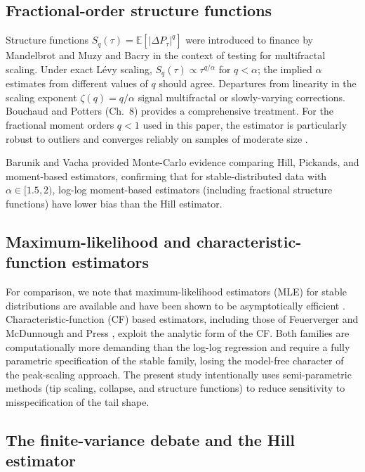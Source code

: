 \documentclass[12pt,a4paper]{article}
\begin{document}
\subsection{Fractional-order structure functions}

Structure functions $S_q(\tau) = \mathbb{E}[|\Delta P_\tau|^q]$ were introduced
to finance by Mandelbrot \cite{Mandelbrot1997} and Muzy and Bacry \cite{MuzyBacry1993} in the
context of testing for multifractal scaling. Under exact Lévy scaling,
$S_q(\tau) \propto \tau^{q/\alpha}$ for $q < \alpha$; the implied $\alpha$
estimates from different values of $q$ should agree. Departures from linearity
in the scaling exponent $\zeta(q) = q/\alpha$ signal multifractal or
slowly-varying corrections. Bouchaud and Potters \cite{BouchaudPotters2003} (Ch.~8) provides a
comprehensive treatment. For the fractional moment orders $q < 1$ used in this
paper, the estimator is particularly robust to outliers and converges reliably
on samples of moderate size \cite{Uchaikin2003}.

Barunik and Vacha \cite{Barunik2010} provided Monte-Carlo evidence comparing Hill, Pickands,
and moment-based estimators, confirming that for stable-distributed data with
$\alpha \in [1.5,2)$, log-log moment-based estimators (including fractional
structure functions) have lower bias than the Hill estimator.

\subsection{Maximum-likelihood and characteristic-function estimators}

For comparison, we note that maximum-likelihood estimators (MLE) for stable
distributions are available \cite{Nolan2001} and have been shown to be
asymptotically efficient \cite{DuMoutierde1983}. Characteristic-function
(CF) based estimators, including those of Feuerverger and McDunnough \cite{Feuerverger1981} and
Press \cite{Press1972}, exploit the analytic form of the CF. Both families are
computationally more demanding than the log-log regression and require a fully
parametric specification of the stable family, losing the model-free character
of the peak-scaling approach. The present study intentionally uses
semi-parametric methods (tip scaling, collapse, and structure functions) to
reduce sensitivity to misspecification of the tail shape.

\subsection{The finite-variance debate and the Hill estimator}
\end{document}
